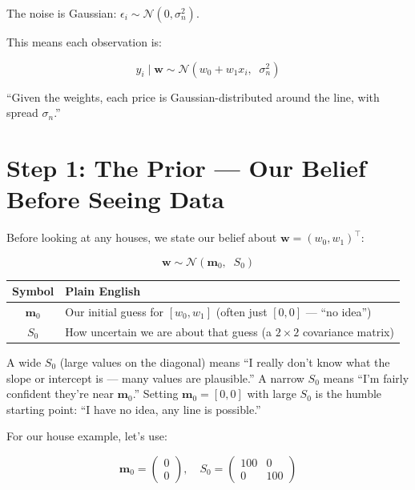 \documentclass[11pt, a4paper]{article}
\newcommand{\gut}[1]{\begin{tcolorbox}[colback=lightyellow, colframe=orange!50, title=Gut feeling]#1\end{tcolorbox}}
\begin{document}
The noise is Gaussian: $\epsilon_i \sim \mathcal{N}(0, \sigma_n^2)$.

This means each observation is:

\begin{equation}
y_i \mid \mathbf{w} \sim \mathcal{N}(w_0 + w_1 x_i, \;\; \sigma_n^2)
\tag{B-2}
\end{equation}

``Given the weights, each price is Gaussian-distributed around the line, with spread $\sigma_n$.''


\section*{\color{secblue}Step 1: The Prior --- Our Belief Before Seeing Data}

Before looking at any houses, we state our belief about $\mathbf{w} = (w_0, w_1)^\top$:

\begin{equation}
\mathbf{w} \sim \mathcal{N}(\mathbf{m}_0, \;\; S_0)
\tag{B-3}
\end{equation}

\begin{center}
\begin{tabular}{cl}
\toprule
\textbf{Symbol} & \textbf{Plain English} \\
\midrule
$\mathbf{m}_0$ & Our initial guess for $[w_0, w_1]$ (often just $[0, 0]$ --- ``no idea'') \\
$S_0$ & How uncertain we are about that guess (a $2\times 2$ covariance matrix) \\
\bottomrule
\end{tabular}
\end{center}

\gut{
A wide $S_0$ (large values on the diagonal) means ``I really don't know what the slope or intercept is --- many values are plausible.'' A narrow $S_0$ means ``I'm fairly confident they're near $\mathbf{m}_0$.'' Setting $\mathbf{m}_0 = [0, 0]$ with large $S_0$ is the humble starting point: ``I have no idea, any line is possible.''
}

For our house example, let's use:

\begin{equation}
\mathbf{m}_0 = \begin{pmatrix} 0 \\ 0 \end{pmatrix}, \quad
S_0 = \begin{pmatrix} 100 & 0 \\ 0 & 100 \end{pmatrix}
\tag{B-4}
\end{equation}
\end{document}

